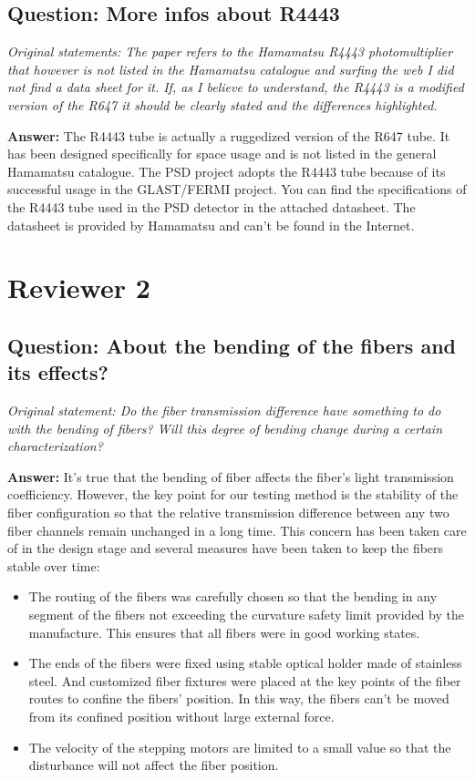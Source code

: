 \documentclass[]{article}
\begin{document}
\subsection{Question: More infos about R4443}
\textit{Original statements: The paper refers to the Hamamatsu R4443 photomultiplier that however is not listed in the Hamamatsu catalogue and surfing the web I did not find a data sheet for it. If, as I believe to understand, the R4443 is a modified version of the R647 it should be clearly stated and the differences highlighted.}\newline

\textbf{Answer:}\newline
The R4443 tube is actually a ruggedized version of the R647 tube. It has been designed specifically for space usage and is not listed in the general Hamamatsu catalogue. The PSD project adopts the R4443 tube because of its successful usage in the GLAST/FERMI project. You can find the specifications of the R4443 tube used in the PSD detector in the attached datasheet. The datasheet is provided by  Hamamatsu and can't be found in the Internet. 

\section{Reviewer 2}
\subsection{Question: About the bending of the fibers and its effects?}
\textit{Original statement: Do the fiber transmission difference have something to do with the bending of fibers?
Will this degree of bending change during a certain characterization?}\newline

\textbf{Answer:}\newline
It's true that the bending of fiber affects the fiber's light transmission coefficiency. However, the key point for our testing method is the stability of the fiber configuration so that the relative transmission difference between any two fiber channels remain unchanged in a long time. This concern has been taken care of in the design stage and several measures have been taken to keep the fibers stable over time:
\begin{itemize}
	\item The routing of the fibers was carefully chosen so that the bending in any segment of the fibers not exceeding the curvature safety limit provided by the manufacture. This ensures that all fibers were in good working states.
	\item The ends of the fibers were fixed using stable optical holder made of stainless steel. And customized fiber fixtures were placed at the key points of the fiber routes to confine the fibers' position. In this way, the fibers can't be moved from its confined position without large external force.
	\item The velocity of the stepping motors are limited to a small value so that the disturbance will not affect the fiber position.
\end{itemize}
\end{document}
